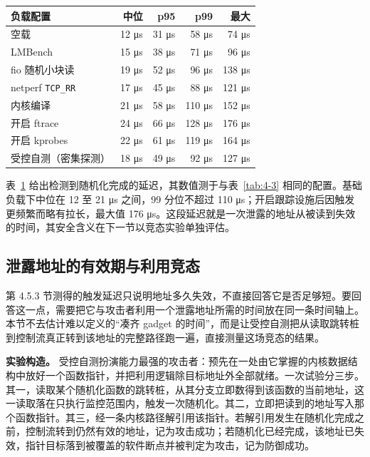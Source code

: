 \begin{table}[!htbp]
    \label{tab:4-4}
    \centering
    \footnotesize
    \setlength{\tabcolsep}{3pt}
    \renewcommand{\arraystretch}{1.25}
    \begin{tabular}{lrrrr}
        \hline
        负载配置 & 中位 & p95 & p99 & 最大\\
        \hline
        空载 & 12 μs & 31 μs & 58 μs & 74 μs\\
        LMBench & 15 μs & 38 μs & 71 μs & 96 μs\\
        fio 随机小块读 & 19 μs & 52 μs & 96 μs & 138 μs\\
        netperf \lstinline[breaklines=false]@TCP_RR@ & 17 μs & 45 μs & 88 μs & 121 μs\\
        内核编译 & 21 μs & 58 μs & 110 μs & 152 μs\\
        开启 ftrace & 24 μs & 66 μs & 128 μs & 176 μs\\
        开启 kprobes & 22 μs & 61 μs & 119 μs & 164 μs\\
        受控自测（密集探测） & 18 μs & 49 μs & 92 μs & 127 μs\\
        \hline
    \end{tabular}
\end{table}

表~\ref{tab:4-4} 给出检测到随机化完成的延迟，其数值测于与表~\ref{tab:4-3} 相同的配置。基础负载下中位在 12 至 21 μs 之间，99 分位不超过 110 μs；开启跟踪设施后因触发更频繁而略有拉长，最大值 176 μs。这段延迟就是一次泄露的地址从被读到失效的时间，其安全含义在下一节以竞态实验单独评估。

\subsection{泄露地址的有效期与利用竞态}

第 4.5.3 节测得的触发延迟只说明地址多久失效，不直接回答它是否足够短。要回答这一点，需要把它与攻击者利用一个泄露地址所需的时间放在同一条时间轴上。本节不去估计难以定义的“凑齐 gadget 的时间”，而是让受控自测把从读取跳转桩到控制流真正转到该地址的完整路径跑一遍，直接测量这场竞态的结果。

\textbf{实验构造。} 受控自测扮演能力最强的攻击者：预先在一处由它掌握的内核数据结构中放好一个函数指针，并把利用逻辑除目标地址外全部就绪。一次试验分三步。其一，读取某个随机化函数的跳转桩，从其分支立即数得到该函数的当前地址，这一读取落在只执行监控范围内，触发一次随机化。其二，立即把读到的地址写入那个函数指针。其三，经一条内核路径解引用该指针。若解引用发生在随机化完成之前，控制流转到仍然有效的地址，记为攻击成功；若随机化已经完成，该地址已失效，指针目标落到被覆盖的软件断点并被判定为攻击，记为防御成功。

